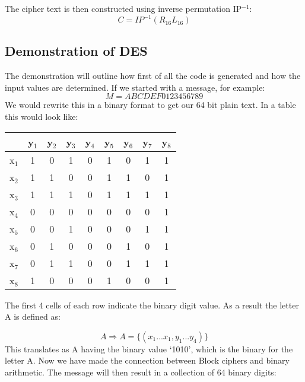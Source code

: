 \documentclass[11pt,a4paper]{report}
\begin{document}
The cipher text is then constructed using inverse permutation IP$^{-1}$:
\begin{displaymath}
C = IP^{-1}(R_{16}L_{16})
\end{displaymath}


\subsection{Demonstration of DES}
\label{subsec: DemoDES}

The demonstration will outline how first of all the code is generated and how the input values are determined. If we started with a message, for example:
\begin{displaymath}
M = ABCDEF0123456789
\end{displaymath}
We would rewrite this in a binary format to get our 64 bit plain text. In a table this would look like:

\begin{center}
\begin{tabular}{ |c|c|c|c|c|c|c|c|c| }
\hline
  {} & y$_{1}$ & y$_{2}$ & y$_{3}$ & y$_{4}$ & y$_{5}$ & y$_{6}$ & y$_{7}$ & y$_{8}$ \\ \hline
  x$_{1}$ & 1 & 0 & 1 & 0 & 1 & 0 & 1 & 1 \\ \hline
  x$_{2}$ & 1 & 1 & 0 & 0 & 1 & 1 & 0 & 1 \\ \hline
  x$_{3}$ & 1 & 1 & 1 & 0 & 1 & 1 & 1 & 1 \\ \hline
  x$_{4}$ & 0 & 0 & 0 & 0 & 0 & 0 & 0 & 1 \\ \hline
  x$_{5}$ & 0 & 0 & 1 & 0 & 0 & 0 & 1 & 1 \\ \hline
  x$_{6}$ & 0 & 1 & 0 & 0 & 0 & 1 & 0 & 1 \\ \hline
  x$_{7}$ & 0 & 1 & 1 & 0 & 0 & 1 & 1 & 1 \\ \hline
  x$_{8}$ & 1 & 0 & 0 & 0 & 1 & 0 & 0 & 1 \\ \hline
\end{tabular}
\end{center}

The first 4 cells of each row indicate the binary digit value. As a result the letter A is defined as:

\begin{displaymath}
A \Rightarrow A = \{(x_{1}...x_{1}, y_{1}...y_{4})\}
\end{displaymath}
This translates as A having the binary value `1010', which is the binary for the letter A. Now we have made the connection between Block ciphers and binary arithmetic. The message will then result in a collection of 64 binary digits:
\end{document}
